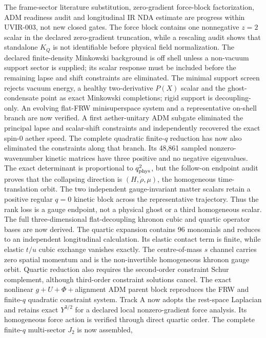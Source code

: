 The frame-sector literature substitution, zero-gradient force-block
factorization, ADM readiness audit and longitudinal IR NDA estimate are
progress within UVIR-003, not new closed gates.  The force block contains one
nonnegative $z=2$ scalar in the declared zero-gradient truncation, while a
rescaling audit shows that standalone $K_Q$ is not identifiable before
physical field normalization.  The declared finite-density Minkowski
background is off shell unless a non-vacuum support sector is supplied; its
scalar response must be included before the remaining lapse and shift
constraints are eliminated.  The minimal support screen rejects vacuum
energy, a healthy two-derivative $P(X)$ scalar and the ghost-condensate point
as exact Minkowski completions; rigid support is decoupling-only.  An evolving
flat-FRW minisuperspace system and a representative on-shell branch are now
verified.  A first aether-unitary ADM subgate eliminated the principal lapse
and scalar-shift constraints and independently recovered the exact spin-0
aether speed.  The complete quadratic finite-$q$ reduction has now also
eliminated the constraints along that branch.  Its 48,861 sampled
nonzero-wavenumber kinetic matrices have three positive and no negative
eigenvalues.  The exact determinant is proportional to $q_{\rm phys}^2$, but
the follow-on endpoint audit proves that the collapsing direction is
$(H,\dot\rho,\mu)$, the homogeneous time-translation orbit.  The two
independent gauge-invariant matter scalars retain a positive regular $q=0$
kinetic block across the representative trajectory.  Thus the rank loss is a
gauge endpoint, not a physical ghost or a third homogeneous scalar.  The full
three-dimensional flat-decoupling khronon cubic and quartic operator bases are
now derived.  The quartic expansion contains 96 monomials and reduces to an
independent longitudinal calculation.  Its elastic contact term is finite,
while elastic $t/u$ cubic exchange vanishes exactly.  The centre-of-mass
$s$ channel carries zero spatial momentum and is the non-invertible homogeneous
khronon gauge orbit.  Quartic reduction also requires the second-order
constraint Schur complement, although third-order constraint solutions cancel.
The exact nonlinear $g+U+\Phi+$alignment ADM parent block reproduces the FRW
and finite-$q$ quadratic constraint system.  Track A now adopts the rest-space
Laplacian and retains exact $Y^{3/2}$ for a declared local nonzero-gradient
force analysis.  Its homogeneous force action is verified through direct
quartic order.  The complete finite-$q$ multi-sector $J_2$ is now assembled,
